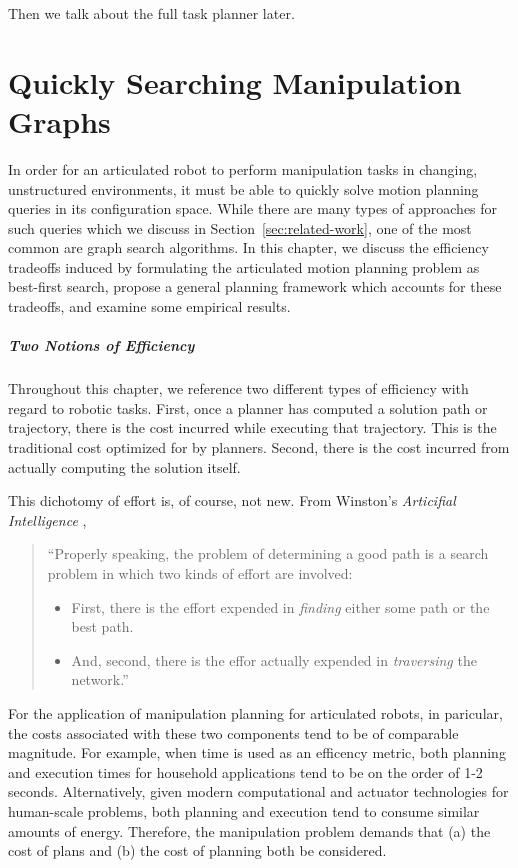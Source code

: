 \documentclass{report}
\begin{document}
Then we talk about the full task planner later.


\newpage
\chapter{Quickly Searching Manipulation Graphs}
\label{chap:inflate}

In order for an articulated robot to perform manipulation tasks
in changing, unstructured environments,
it must be able to quickly solve motion planning queries in its
configuration space.
While there are many types of approaches for such queries
which we discuss in Section~\ref{sec:related-work},
one of the most common are graph search algorithms.
In this chapter,
we discuss the efficiency tradeoffs induced by formulating
the articulated motion planning problem as best-first search,
propose a general planning framework which accounts for these tradeoffs,
and examine some empirical results.

\paragraph{Two Notions of Efficiency}

Throughout this chapter,
we reference two different types of efficiency
with regard to robotic tasks.
First, once a planner has computed a solution path or trajectory,
there is the cost incurred while executing that trajectory.
This is the traditional cost optimized for by planners.
Second, there is the cost incurred from actually computing the solution
itself.

This dichotomy of effort is, of course, not new.
From Winston's \emph{Articifial Intelligence} \cite{winston1977ai},
\begin{quote}
   ``Properly speaking, the problem of determining a good path is a search
   problem in which two kinds of effort are involved:
   \begin{itemize}
   \item First, there is the effort expended in \emph{finding} either
      some path or the best path.
   \item And, second, there is the effor actually expended in
      \emph{traversing} the network.''
   \end{itemize}
\end{quote}

For the application of manipulation planning for articulated robots,
in paricular,
the costs associated with these two components tend to be of comparable
magnitude.
For example,
when time is used as an efficency metric,
both planning and execution times for household applications
tend to be on the order of 1-2 seconds.
Alternatively, given
modern computational and actuator technologies for human-scale problems,
both planning and execution tend to consume similar amounts of energy.
Therefore,
the manipulation problem demands that
(a) the cost of plans and
(b) the cost of planning both be considered.
\end{document}
